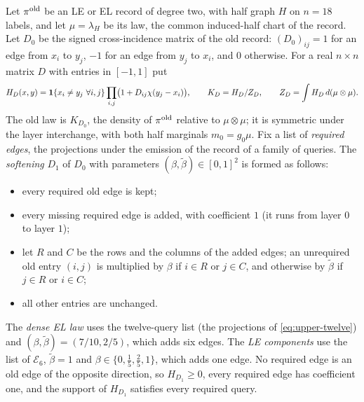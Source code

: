 \begin{definition}\label{def:dense-comparison}
Let $\pi^{\rm old}$ be an LE or EL record of degree two, with half graph $H$ on
$n=18$ labels, and let $\mu=\lambda_H$ be its law, the common induced-half chart
of the record. Let $D_0$ be the signed cross-incidence matrix of the old record:
$(D_0)_{ij}=1$ for an edge from $x_i$ to $y_j$, $-1$ for an edge from $y_j$ to
$x_i$, and $0$ otherwise. For a real $n\times n$ matrix $D$ with entries in
$[-1,1]$ put
\[
 H_D(x,y)=\mathbf 1\{x_i\ne y_j\ \forall i,j\}\prod_{i,j}\bigl(1+D_{ij}\chi(y_j-x_i)\bigr),
 \qquad K_D=H_D/Z_D,\qquad Z_D=\int H_D\,d(\mu\otimes\mu).
\]
The old law is $K_{D_0}$, the density of $\pi^{\rm old}$ relative to $\mu\otimes\mu$;
it is symmetric under the layer interchange, with both half marginals
$m_0=g_0\mu$. Fix a list of \emph{required edges}, the projections under the
emission of the record of a family of queries. The \emph{softening} $D_1$ of $D_0$
with parameters $(\beta,\tilde\beta)\in[0,1]^2$ is formed as follows:
\begin{itemize}
\item every required old edge is kept;
\item every missing required edge is added, with coefficient $1$ (it runs from
 layer $0$ to layer $1$);
\item let $R$ and $C$ be the rows and the columns of the added edges; an unrequired
 old entry $(i,j)$ is multiplied by $\beta$ if $i\in R$ or $j\in C$, and otherwise
 by $\tilde\beta$ if $j\in R$ or $i\in C$;
\item all other entries are unchanged.
\end{itemize}
The \emph{dense EL law} uses the twelve-query list (the projections of
\eqref{eq:upper-twelve}) and $(\beta,\tilde\beta)=(7/10,2/5)$, which adds six
edges. The \emph{LE components} use the list of $\mathcal E_6$, $\tilde\beta=1$ and
$\beta\in\{0,\frac15,\frac25,1\}$, which adds one edge. No required edge is an old
edge of the opposite direction, so $H_{D_1}\ge0$, every required edge has
coefficient one, and the support of $H_{D_1}$ satisfies every required query.
\end{definition}

